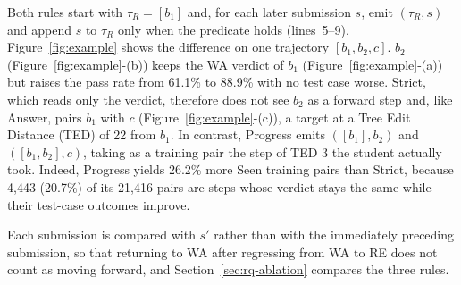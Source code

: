 \documentclass[conference]{IEEEtran}
\begin{document}
Both rules start with \(\tau_R=[b_1]\) and, for each later submission \(s\), emit \((\tau_R,s)\) and append \(s\) to \(\tau_R\) only when the predicate holds (lines~5--9). Figure~\ref{fig:example} shows the difference on one trajectory \([b_1,b_2,c]\). \(b_2\) (Figure~\ref{fig:example}-(b)) keeps the WA verdict of \(b_1\) (Figure~\ref{fig:example}-(a)) but raises the pass rate from 61.1\% to 88.9\% with no test case worse. Strict, which reads only the verdict, therefore does not see \(b_2\) as a forward step and, like Answer, pairs \(b_1\) with \(c\) (Figure~\ref{fig:example}-(c)), a target at a Tree Edit Distance (TED) of 22 from \(b_1\). In contrast, Progress emits \(([b_1],b_2)\) and \(([b_1,b_2],c)\), taking as a training pair the step of TED 3 the student actually took. Indeed, Progress yields 26.2\% more Seen training pairs than Strict, because 4,443 (20.7\%) of its 21,416 pairs are steps whose verdict stays the same while their test-case outcomes improve.

Each submission is compared with \(s'\) rather than with the immediately preceding submission, so that returning to WA after regressing from WA to RE does not count as moving forward, and Section~\ref{sec:rq-ablation} compares the three rules.
\end{document}

